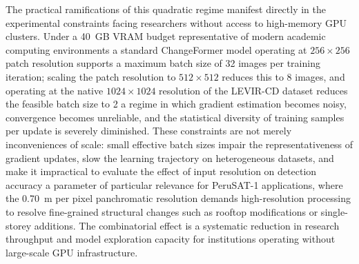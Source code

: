 The practical ramifications of this quadratic regime manifest directly in the experimental constraints facing researchers without access to high-memory \ac{GPU} clusters. Under a 40~GB \ac{VRAM} budget representative of modern academic computing environments a standard ChangeFormer model operating at $256 \times 256$ patch resolution supports a maximum batch size of 32 images per training iteration; scaling the patch resolution to $512 \times 512$ reduces this to 8 images, and operating at the native $1024 \times 1024$ resolution of the LEVIR-CD dataset reduces the feasible batch size to 2 a regime in which gradient estimation becomes noisy, convergence becomes unreliable, and the statistical diversity of training samples per update is severely diminished. These constraints are not merely inconveniences of scale: small effective batch sizes impair the representativeness of gradient updates, slow the learning trajectory on heterogeneous datasets, and make it impractical to evaluate the effect of input resolution on detection accuracy a parameter of particular relevance for PeruSAT-1 applications, where the 0.70~m per pixel panchromatic resolution demands high-resolution processing to resolve fine-grained structural changes such as rooftop modifications or single-storey additions. The combinatorial effect is a systematic reduction in research throughput and model exploration capacity for institutions operating without large-scale \ac{GPU} infrastructure.

